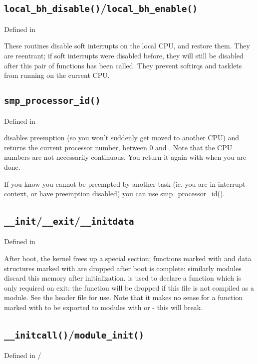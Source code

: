\documentclass[a4paper,8pt,english]{sphinxmanual}
\begin{document}
\subsection{\texttt{local\_bh\_disable()}/\texttt{local\_bh\_enable()}}
\label{kernel-hacking/hacking:local-bh-disable}\label{kernel-hacking/hacking:local-bh-disable-local-bh-enable}
Defined in 

These routines disable soft interrupts on the local CPU, and restore
them. They are reentrant; if soft interrupts were disabled before, they
will still be disabled after this pair of functions has been called.
They prevent softirqs and tasklets from running on the current CPU.


\subsection{\texttt{smp\_processor\_id()}}
\label{kernel-hacking/hacking:smp-processor-id}
Defined in 

 disables preemption (so you won't suddenly get
moved to another CPU) and returns the current processor number, between
0 and . Note that the CPU numbers are not necessarily
continuous. You return it again with  when you
are done.

If you know you cannot be preempted by another task (ie. you are in
interrupt context, or have preemption disabled) you can use
smp\_processor\_id().


\subsection{\texttt{\_\_init}/\texttt{\_\_exit}/\texttt{\_\_initdata}}
\label{kernel-hacking/hacking:init-exit-initdata}
Defined in  

After boot, the kernel frees up a special section; functions marked with
 and data structures marked with  are dropped
after boot is complete: similarly modules discard this memory after
initialization.  is used to declare a function which is only
required on exit: the function will be dropped if this file is not
compiled as a module. See the header file for use. Note that it makes no
sense for a function marked with  to be exported to modules
with  or - this
will break.


\subsection{\texttt{\_\_initcall()}/\texttt{module\_init()}}
\label{kernel-hacking/hacking:initcall-module-init}
Defined in   / 
\end{document}
